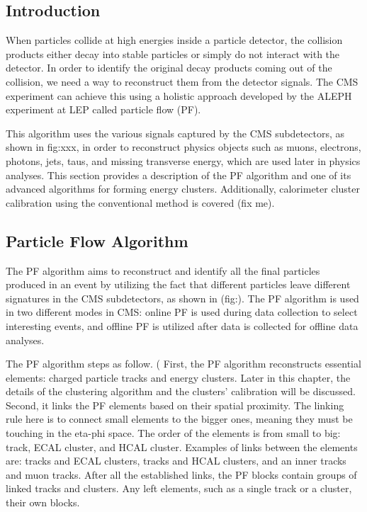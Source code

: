 \subsection{Introduction}
When particles collide at high energies inside a particle detector, the collision products either decay into stable particles or simply do not interact with the detector.
In order to identify the original decay products coming out of the collision, we need a way to reconstruct them from the detector signals.
The CMS experiment can achieve this using a holistic approach developed by the ALEPH experiment at LEP called particle flow (PF).

This algorithm uses the various signals captured by the CMS subdetectors, as shown in fig:xxx, %
in order to reconstruct physics objects such as muons, electrons, photons, jets, taus, and missing transverse energy, which are used later in physics analyses.
This section provides a description of the PF algorithm and one of its advanced algorithms for forming energy clusters. Additionally, calorimeter cluster calibration using the conventional method is covered (fix me).

\subsection{Particle Flow Algorithm}
The PF algorithm aims to reconstruct and identify all the final particles produced in an event by utilizing the fact that different particles leave different signatures in the CMS subdetectors, as shown in (fig:). %
The PF algorithm is used in two different modes in CMS: online PF is used during data collection to select interesting events, and offline PF is utilized after data is collected for offline data analyses. %

The PF algorithm steps as follow. (%
First, the PF algorithm reconstructs essential elements: charged particle tracks and energy clusters.
Later in this chapter, the details of the clustering algorithm and the clusters' calibration will be discussed.
Second, it links the PF elements based on their spatial proximity.
The linking rule here is to connect small elements to the bigger ones, meaning they must be touching in the eta-phi space.
The order of the elements is from small to big: track, ECAL cluster, and HCAL cluster.
Examples of links between the elements are: tracks and ECAL clusters, tracks and HCAL clusters, and an inner tracks and muon tracks.
After all the established links, the PF blocks contain groups of linked tracks and clusters.
Any left elements, such as a single track or a cluster,  their own blocks.

